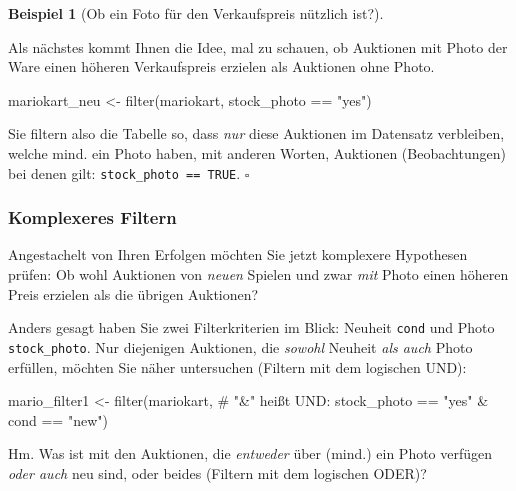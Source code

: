 \documentclass[
  letterpaper,
]{scrbook}
\newenvironment{Shaded}{\begin{snugshade}}{\end{snugshade}}
\newcommand{\CommentTok}[1]{\textcolor[rgb]{0.37,0.37,0.37}{#1}}
\newcommand{\FunctionTok}[1]{\textcolor[rgb]{0.28,0.35,0.67}{#1}}
\newcommand{\NormalTok}[1]{\textcolor[rgb]{0.00,0.23,0.31}{#1}}
\newcommand{\OtherTok}[1]{\textcolor[rgb]{0.00,0.23,0.31}{#1}}
\newcommand{\SpecialCharTok}[1]{\textcolor[rgb]{0.37,0.37,0.37}{#1}}
\newcommand{\StringTok}[1]{\textcolor[rgb]{0.13,0.47,0.30}{#1}}
\theoremstyle{definition}
\theoremstyle{definition}
\newtheorem{example}{Beispiel}[chapter]
\theoremstyle{definition}
\theoremstyle{remark}
\begin{document}
\begin{example}[Ob ein Foto für den Verkaufspreis nützlich
ist?]\protect\hypertarget{exm-filter}{}\label{exm-filter}

Als nächstes kommt Ihnen die Idee, mal zu schauen, ob Auktionen mit
Photo der Ware einen höheren Verkaufspreis erzielen als Auktionen ohne
Photo.

\begin{Shaded}
\begin{Highlighting}[]
\NormalTok{mariokart\_neu }\OtherTok{\textless{}{-}} \FunctionTok{filter}\NormalTok{(mariokart, stock\_photo }\SpecialCharTok{==} \StringTok{"yes"}\NormalTok{)}
\end{Highlighting}
\end{Shaded}

Sie filtern also die Tabelle so, dass \emph{nur} diese Auktionen im
Datensatz verbleiben, welche mind. ein Photo haben, mit anderen Worten,
Auktionen (Beobachtungen) bei denen gilt:
\texttt{stock\_photo\ ==\ TRUE}. \(\square\)

\end{example}

\subsubsection{Komplexeres Filtern}\label{komplexeres-filtern}

Angestachelt von Ihren Erfolgen möchten Sie jetzt komplexere Hypothesen
prüfen: Ob wohl Auktionen von \emph{neuen} Spielen und zwar \emph{mit}
Photo einen höheren Preis erzielen als die übrigen Auktionen?

Anders gesagt haben Sie zwei Filterkriterien im Blick: Neuheit
\texttt{cond} und Photo \texttt{stock\_photo}. Nur diejenigen Auktionen,
die \emph{sowohl} Neuheit \emph{als auch} Photo erfüllen, möchten Sie
näher untersuchen (Filtern mit dem logischen UND):

\begin{Shaded}
\begin{Highlighting}[]
\NormalTok{mario\_filter1 }\OtherTok{\textless{}{-}} 
  \FunctionTok{filter}\NormalTok{(mariokart,  }\CommentTok{\# "\&" heißt UND:}
\NormalTok{         stock\_photo }\SpecialCharTok{==} \StringTok{"yes"} \SpecialCharTok{\&}\NormalTok{ cond }\SpecialCharTok{==} \StringTok{"new"}\NormalTok{)}
\end{Highlighting}
\end{Shaded}

Hm. Was ist mit den Auktionen, die \emph{entweder} über (mind.) ein
Photo verfügen \emph{oder auch} neu sind, oder beides (Filtern mit dem
logischen ODER)?
\end{document}

